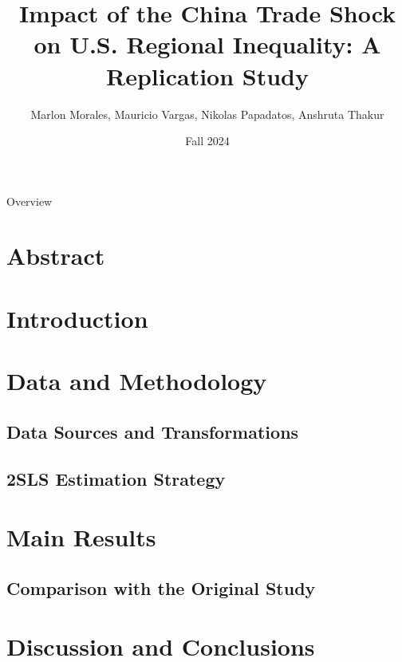 \documentclass{beamer}
\title{Impact of the China Trade Shock on U.S. Regional Inequality: A Replication Study}
\date{Fall 2024}
\author{
    Marlon Morales, Mauricio Vargas, Nikolas Papadatos, Anshruta Thakur
}
\begin{document}
\insertTitleSlide

\begin{frame}{Overview}
    \tableofcontents
\end{frame}

\section{Abstract}
    

\section{Introduction}
    

\section{Data and Methodology}
    \subsection{Data Sources and Transformations}
        
    \subsection{2SLS Estimation Strategy}
        

\section{Main Results}
    
    \subsection{Comparison with the Original Study}
        

\section{Discussion and Conclusions}
    

\insertLastSlide
\end{document}
